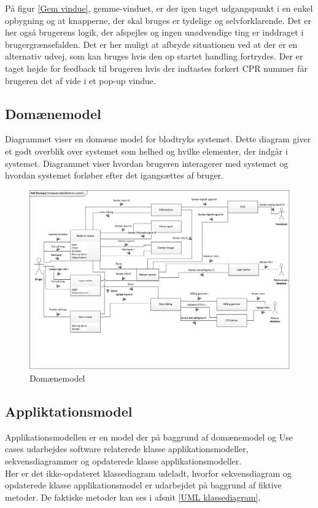 På figur \ref{Gem vindue}, gemme-vinduet, er der igen taget udgangspunkt i en enkel opbygning og at knapperne, der skal bruges er tydelige og selvforklarende. Det er her også brugerens logik, der afspejles og ingen unødvendige ting er inddraget i brugergrænsefalden. Det er her muligt at afbryde situationen ved at der er en alternativ udvej, som kan bruges hvis den op startet handling fortrydes. Der er taget højde for feedback til brugeren hvis der indtastes forkert CPR nummer får brugeren det af vide i et pop-up vindue. 

\subsection{Domænemodel}
Diagrammet viser en domæne model for blodtryks systemet. Dette diagram giver et godt overblik over systemet som helhed og hvilke elementer, der indgår i systemet. Diagrammet viser hvordan brugeren interagerer med systemet og hvordan systemet forløber efter det igangsættes af bruger. 

\begin{figure}[H]
	\centering
	\includegraphics[width=1\textwidth]{Figurer/ISE/Domaenemodel}
	\caption{Domænemodel}
	\label{domaenemodel}
\end{figure}

\subsection{Appliktationsmodel}
Applikationsmodellen er en model der på baggrund af domænemodel og Use cases udarbejdes software relaterede klasse applikationsmodeller, sekvensdiagrammer og opdaterede klasse applikationsmodeller.\\
Her er det ikke-opdateret klassediagram udeladt, hvorfor sekvensdiagram og opdaterede  klasse applikationsmodel er udarbejdet på baggrund af fiktive metoder. De faktiske metoder kan ses i afsnit \ref{UML klassediagram}.

